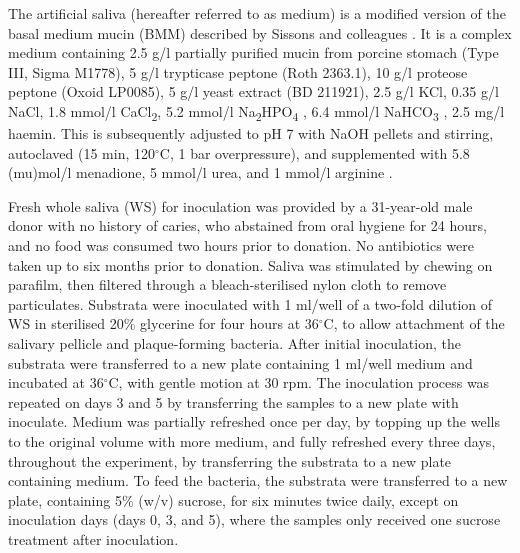 \documentclass[10pt,a4paper]{article}
\begin{document}
The artificial saliva (hereafter referred to as medium) is a modified
version of the basal medium mucin (BMM) described by Sissons and
colleagues \citeyearpar{sissonsMultistationPlaque1991}. It is a complex
medium containing 2.5 g/l partially purified mucin from porcine stomach
(Type III, Sigma M1778), 5 g/l trypticase peptone (Roth 2363.1), 10 g/l
proteose peptone (Oxoid LP0085), 5 g/l yeast extract (BD 211921), 2.5
g/l KCl, 0.35 g/l NaCl, 1.8 mmol/l CaCl\textsubscript{2}, 5.2 mmol/l
Na\textsubscript{2}HPO\textsubscript{4}
\citep{sissonsMultistationPlaque1991}, 6.4 mmol/l NaHCO\textsubscript{3}
\citep{shellisSyntheticSaliva1978}, 2.5 mg/l haemin. This is
subsequently adjusted to pH 7 with NaOH pellets and stirring, autoclaved
(15 min, 120\(^{\circ}\)C, 1 bar overpressure), and supplemented with
5.8 (mu)mol/l menadione, 5 mmol/l urea, and 1 mmol/l arginine
\citep{sissonsMultistationPlaque1991}.

Fresh whole saliva (WS) for inoculation was provided by a 31-year-old
male donor with no history of caries, who abstained from oral hygiene
for 24 hours, and no food was consumed two hours prior to donation. No
antibiotics were taken up to six months prior to donation. Saliva was
stimulated by chewing on parafilm, then filtered through a
bleach-sterilised nylon cloth to remove particulates. Substrata were
inoculated with 1 ml/well of a two-fold dilution of WS in sterilised
20\% glycerine for four hours at 36\(^{\circ}\)C, to allow attachment of
the salivary pellicle and plaque-forming bacteria. After initial
inoculation, the substrata were transferred to a new plate containing 1
ml/well medium and incubated at 36\(^{\circ}\)C, with gentle motion at
30 rpm. The inoculation process was repeated on days 3 and 5 by
transferring the samples to a new plate with inoculate. Medium was
partially refreshed once per day, by topping up the wells to the
original volume with more medium, and fully refreshed every three days,
throughout the experiment, by transferring the substrata to a new plate
containing medium. To feed the bacteria, the substrata were transferred
to a new plate, containing 5\% (w/v) sucrose, for six minutes twice
daily, except on inoculation days (days 0, 3, and 5), where the samples
only received one sucrose treatment after inoculation.
\end{document}
